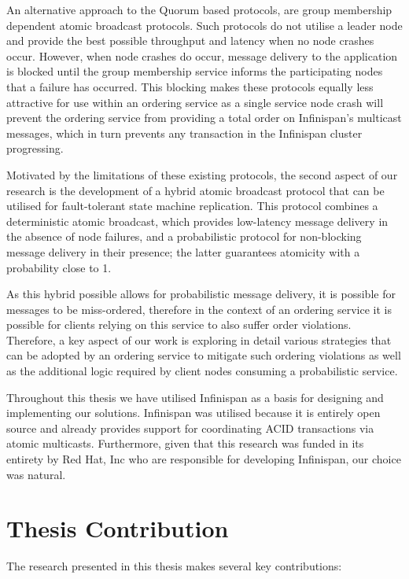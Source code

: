     An alternative approach to the Quorum based protocols, are group membership dependent atomic broadcast protocols.  Such protocols do not utilise a leader node and provide the best possible throughput and latency when no node crashes occur.  However, when node crashes do occur, message delivery to the application is blocked until the group membership service informs the participating nodes that a failure has occurred.  This blocking makes these protocols equally less attractive for use within an ordering service as a single service node crash will prevent the ordering service from providing a total order on Infinispan's multicast messages, which in turn prevents any transaction in the Infinispan cluster progressing.  

    Motivated by the limitations of these existing protocols, the second aspect of our research is the development of a hybrid atomic broadcast protocol that can be utilised for fault-tolerant state machine replication.  This protocol combines a deterministic atomic broadcast, which provides low-latency message delivery in the absence of node failures, and a probabilistic protocol for non-blocking message delivery in their presence; the latter guarantees atomicity with a probability close to 1.
    
        As this hybrid possible allows for probabilistic message delivery, it is possible for messages to be miss-ordered, therefore in the context of an ordering service it is possible for clients relying on this service to also suffer order violations.  Therefore, a key aspect of our work is exploring in detail various strategies that can be adopted by an ordering service to mitigate such ordering violations as well as the additional logic required by client nodes consuming a probabilistic service.  
   
   Throughout this thesis we have utilised Infinispan as a basis for designing and implementing our solutions.  Infinispan was utilised because it is entirely open source and already provides support for coordinating ACID transactions via atomic multicasts.  Furthermore, given that this research was funded in its entirety by Red Hat, Inc who are responsible for developing Infinispan, our choice was natural.  
   
    \section{Thesis Contribution}
    The research presented in this thesis makes several key contributions:
    
